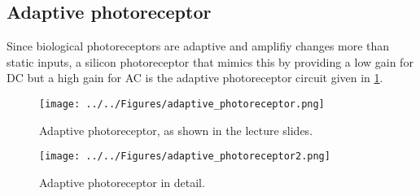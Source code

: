 \subsection{Adaptive photoreceptor}

Since biological photoreceptors are adaptive and amplifiy changes more than static inputs, a silicon photoreceptor that mimics this by providing a low gain for DC but a high gain for AC is the adaptive photoreceptor circuit given in \ref{fig:AdaptivePhotoreceptor1}.

\begin{figure}[H]
    \centering
    \texttt{[image: ../../Figures/adaptive\_photoreceptor.png]}
    \caption{Adaptive photoreceptor, as shown in the lecture slides.}
    \label{fig:AdaptivePhotoreceptor1}
\end{figure}

\begin{figure}[H]
    \centering
    \texttt{[image: ../../Figures/adaptive\_photoreceptor2.png]}
    \caption{Adaptive photoreceptor in detail.}
    \label{fig:AdaptivePhotoreceptor2}
\end{figure}